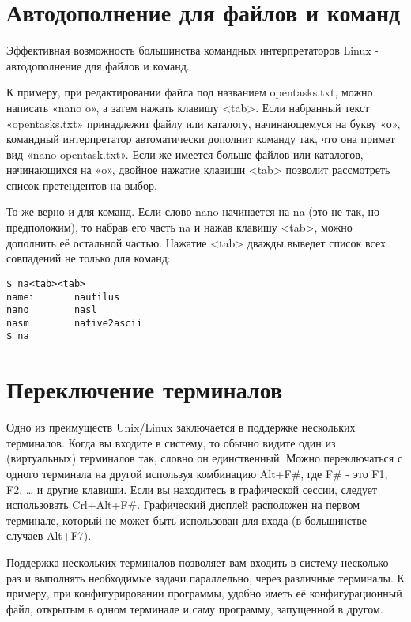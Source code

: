 \documentclass[12pt]{book}
\begin{document}
\section{Автодополнение для файлов и команд}

Эффективная возможность большинства командных интерпретаторов Linux - автодополнение для файлов и команд.

\sloppy К примеру, при редактировании файла под названием opentasks.txt, можно написать «nano o», а затем нажать клавишу <tab>. Если набранный текст «opentasks.txt» принадлежит файлу или каталогу, начинающемуся на букву «о», командный интерпретатор автоматически дополнит команду так, что она примет вид «nano opentask.txt». Если же имеется больше файлов или каталогов, начинающихся на «o», двойное нажатие клавиши <tab> позволит рассмотреть список претендентов на выбор.

То же верно и для команд. Если слово nano начинается на na (это не так, но предположим), то набрав его часть na и нажав клавишу <tab>, можно дополнить её остальной частью. Нажатие <tab> дважды выведет список всех совпадений не только для команд: 

\vspace{3mm}
\begin{tcolorbox}
\begin{lstlisting}
$ na<tab><tab>
namei		nautilus
nano		nasl
nasm		native2ascii
$ na
\end{lstlisting}
\end{tcolorbox}

\section{Переключение терминалов}

Одно из преимуществ Unix/Linux заключается в поддержке нескольких терминалов. Когда вы входите в систему, то обычно видите один из (виртуальных) терминалов так, словно он единственный. Можно переключаться с одного терминала на другой используя комбинацию Alt+F\#, где F\# - это F1, F2, … и другие клавиши. Если вы находитесь в графической сессии, следует использовать Crl+Alt+F\#. Графический дисплей расположен на первом терминале, который не может быть использован для входа (в большинстве случаев Alt+F7).

Поддержка нескольких терминалов позволяет вам входить в систему несколько раз и выполнять необходимые задачи параллельно, через различные терминалы. К примеру, при конфигурировании программы, удобно иметь её конфигурационный файл, открытым в одном терминале и саму программу, запущенной в другом. 
\end{document}
